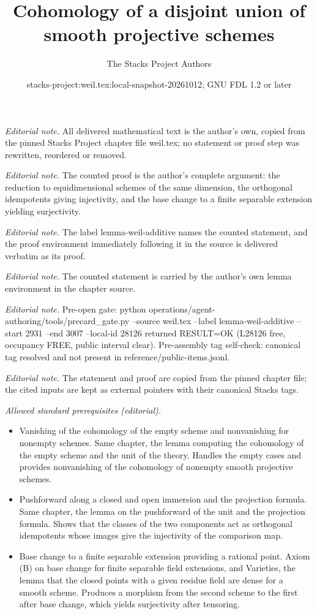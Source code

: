 \documentclass[10pt,a4paper]{amsart}
\title{Cohomology of a disjoint union of smooth projective schemes}
\author{The Stacks Project Authors}
\date{stacks-project:weil.tex:local-snapshot-20261012; GNU FDL 1.2 or later}
\theoremstyle{plain}
\theoremstyle{definition}
\theoremstyle{remark}
\numberwithin{equation}{subsection}
\begin{document}
\maketitle
\noindent\textit{Editorial note.} All delivered mathematical text is the author's own, copied from the pinned Stacks Project chapter file weil.tex; no statement or proof step was rewritten, reordered or removed.\par\medskip
\noindent\textit{Editorial note.} The counted proof is the author's complete argument: the reduction to equidimensional schemes of the same dimension, the orthogonal idempotents giving injectivity, and the base change to a finite separable extension yielding surjectivity.\par\medskip
\noindent\textit{Editorial note.} The label lemma-weil-additive names the counted statement, and the proof environment immediately following it in the source is delivered verbatim as its proof.\par\medskip
\noindent\textit{Editorial note.} The counted statement is carried by the author's own lemma environment in the chapter source.\par\medskip
\noindent\textit{Editorial note.} Pre-open gate: python operations/agent-authoring/tools/precard\_gate.py --source weil.tex --label lemma-weil-additive --start 2931 --end 3007 --local-id 28126 returned RESULT=OK (L28126 free, occupancy FREE, public interval clear). Pre-assembly tag self-check: canonical tag resolved and not present in reference/public-items.jsonl.\par\medskip
\noindent\textit{Editorial note.} The statement and proof are copied from the pinned chapter file; the cited inputs are kept as external pointers with their canonical Stacks tags.\par\medskip
\noindent\textit{Allowed standard prerequisites (editorial).}\begin{itemize}
\item Vanishing of the cohomology of the empty scheme and nonvanishing for nonempty schemes. Same chapter, the lemma computing the cohomology of the empty scheme and the unit of the theory. Handles the empty cases and provides nonvanishing of the cohomology of nonempty smooth projective schemes.
\item Pushforward along a closed and open immersion and the projection formula. Same chapter, the lemma on the pushforward of the unit and the projection formula. Shows that the classes of the two components act as orthogonal idempotents whose images give the injectivity of the comparison map.
\item Base change to a finite separable extension providing a rational point. Axiom (B) on base change for finite separable field extensions, and Varieties, the lemma that the closed points with a given residue field are dense for a smooth scheme. Produces a morphism from the second scheme to the first after base change, which yields surjectivity after tensoring.
\end{itemize}\medskip
\end{document}
